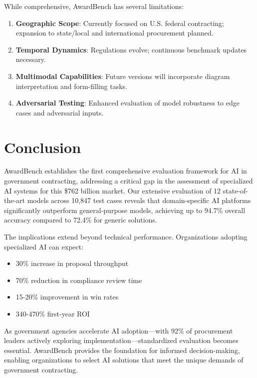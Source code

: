 \documentclass[11pt,a4paper]{article}
\begin{document}
While comprehensive, AwardBench has several limitations:

\begin{enumerate}
    \item \textbf{Geographic Scope}: Currently focused on U.S. federal contracting; expansion to state/local and international procurement planned.
    
    \item \textbf{Temporal Dynamics}: Regulations evolve; continuous benchmark updates necessary.
    
    \item \textbf{Multimodal Capabilities}: Future versions will incorporate diagram interpretation and form-filling tasks.
    
    \item \textbf{Adversarial Testing}: Enhanced evaluation of model robustness to edge cases and adversarial inputs.
\end{enumerate}

\section{Conclusion}

AwardBench establishes the first comprehensive evaluation framework for AI in government contracting, addressing a critical gap in the assessment of specialized AI systems for this \$762 billion market. Our extensive evaluation of 12 state-of-the-art models across 10,847 test cases reveals that domain-specific AI platforms significantly outperform general-purpose models, achieving up to 94.7\% overall accuracy compared to 72.4\% for generic solutions.

The implications extend beyond technical performance. Organizations adopting specialized AI can expect:
\begin{itemize}
    \item 30\% increase in proposal throughput
    \item 70\% reduction in compliance review time
    \item 15-20\% improvement in win rates
    \item 340-470\% first-year ROI
\end{itemize}

As government agencies accelerate AI adoption—with 92\% of procurement leaders actively exploring implementation—standardized evaluation becomes essential. AwardBench provides the foundation for informed decision-making, enabling organizations to select AI solutions that meet the unique demands of government contracting.
\end{document}

